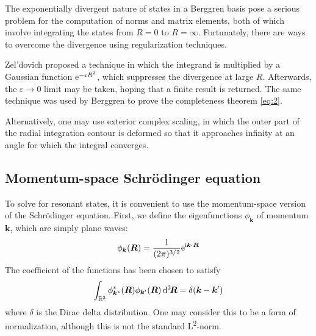 \documentclass[amsmath, amssymb, aps, floatfix, nofootinbib, preprintnumbers,
  showpacs, superscriptaddress, twocolumn]{revtex4-1}
\begin{document}
The exponentially divergent nature of states in a Berggren basis pose a
serious problem for the computation of norms and matrix elements, both of
which involve integrating the states from $R = 0$ to $R = \infty$.
Fortunately, there are ways to overcome the divergence using regularization
techniques.

Zel'dovich proposed\cite{Zeldovich1960} a technique in which the integrand is
multiplied by a Gaussian function $\mathrm e^{-\varepsilon R^2}$, which suppresses
the divergence at large $R$.  Afterwards, the $\varepsilon \to 0$ limit may be
taken, hoping that a finite result is returned.  The same technique was used
by Berggren to prove the completeness theorem \eqref{eq:2}.

Alternatively, one may use exterior complex scaling, in which the outer part
of the radial integration contour is deformed so that it approaches infinity
at an angle for which the integral converges.\cite{Gyarmati1971}

\subsection{Momentum-space Schr\"odinger equation}

To solve for resonant states, it is convenient to use the momentum-space
version of the Schr\"odinger equation.  First, we define the eigenfunctions
$\phi_{\bm k}$ of momentum $\bm k$, which are simply plane waves:
\begin{align*}
  \phi_{\bm k}(\bm R) = \frac{1}{(2 \pi)^{3/2}} \mathrm e^{\mathrm{i} \bm k \cdot \bm R}
\end{align*}
The coefficient of the functions has been chosen to satisfy
\begin{align*}
  \int_{\mathbb R^3} \phi_{\bm k^*}^*(\bm R) \phi_{\bm k'}(\bm R) \operatorname{d \!}\mathord{}^3\!\bm R
  = \delta(\bm k - \bm k')
\end{align*}
where $\delta$ is the Dirac delta distribution.  One may consider this to be a
form of normalization, although this is not the standard
L\textsuperscript{2}-norm.
\end{document}
